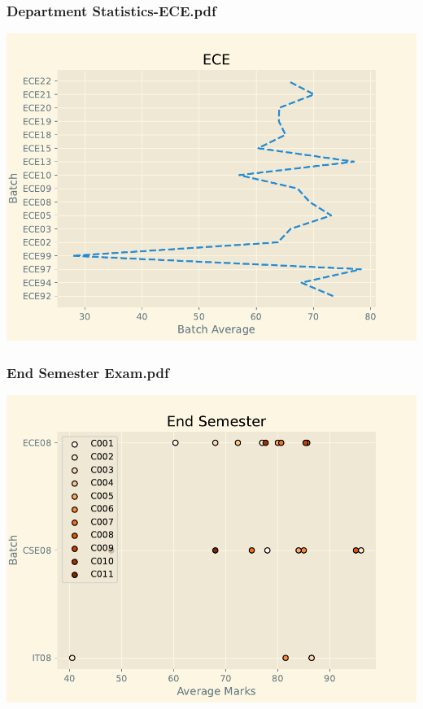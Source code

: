 \subsubsection*{Department Statistics-ECE.pdf}
\includegraphics{outputs/Department Statistics-ECE.pdf}
\subsubsection*{End Semester Exam.pdf}
\includegraphics{outputs/End Semester Exam.pdf}
